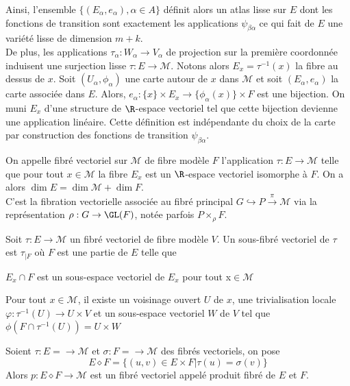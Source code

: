 Ainsi, l'ensemble $\{(E_\alpha, e_\alpha), \alpha \in A\}$ définit alors un atlas lisse sur $E$ dont les fonctions de transition sont exactement les applications $\psi_{\beta\alpha}$ ce qui fait de $E$ une variété lisse de dimension $m+k$. \\

De plus, les applications $\tau_\alpha: W_\alpha \to V_\alpha$ de projection sur la première coordonnée induisent une surjection lisse $\tau: E \to \mathcal{M}$. Notons alors $E_x = \tau^{-1}(x)$ la fibre au dessus de $x$. Soit $(U_\alpha, \phi_\alpha)$ une carte autour de $x$ dans $\mathcal{M}$ et soit $(E_\alpha, e_\alpha)$ la carte associée dans $E$. Alors, $e_\alpha : \{x\}\times E_x \to \{\phi_\alpha(x)\} \times F$ est une bijection. On muni $E_x$ d'une structure de $\R$-espace vectoriel tel que cette bijection devienne une application linéaire. Cette définition est indépendante du choix de la carte par construction des fonctions de transition $\psi_{\beta\alpha}$. \\

\begin{defi}
On appelle fibré vectoriel sur $\mathcal{M}$ de fibre modèle $F$ l'application $\tau: E \to \mathcal{M}$ telle que pour tout $x\in \mathcal{M}$ la fibre $E_x$ est un $\R$-espace vectoriel isomorphe à $F$. On a alors $\dim E = \dim \mathcal{M} + \dim F$. \\
C'est la fibration vectorielle associée au fibré principal $G \hookrightarrow P \overset{\pi}{\to} \mathcal{M}$ via la représentation $\rho : G \to \GL(F)$, notée parfois $P\times_\rho F$.
\end{defi}

\begin{defi}
Soit $\tau: E \to \mathcal{M}$ un fibré vectoriel de fibre modèle $V$. Un sous-fibré vectoriel de $\tau$ est $\tau_{|F}$ où $F$ est une partie de $E$ telle que 
\be
	\item $E_x \cap F$ est un sous-espace vectoriel de $E_x$ pour tout x$\in \mathcal{M}$
	\item Pour tout $x \in \mathcal{M}$, il existe un voisinage ouvert $U$ de $x$, une trivialisation locale $\varphi: \tau^{-1}(U) \to U\times V$ et un sous-espace vectoriel $W$ de $V$ tel que $\phi(F \cap \tau^{-1}(U)) = U \times W$ \\
\ee 
\end{defi}

\begin{defi}
Soient $\tau : E = \to \mathcal{M}$ et $\sigma : F = \to \mathcal{M}$ des fibrés vectoriels, on pose 
$$E\diamond F = \{(u,v) \in E\times F | \tau(u) = \sigma(v)\}$$
Alors $p: E\diamond F \to \mathcal{M}$ est un fibré vectoriel appelé produit fibré de $E$ et $F$.
\end{defi}


